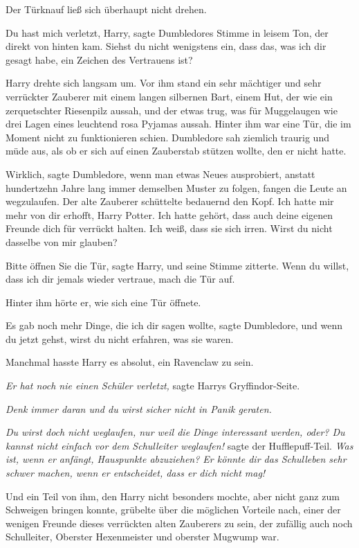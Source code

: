 Der Türknauf ließ sich überhaupt nicht drehen.

\glqq{}Du hast mich verletzt, Harry\grqq{}, sagte Dumbledores Stimme in leisem
Ton, der direkt von hinten kam. \glqq{}Siehst du nicht wenigstens ein, dass das,
was ich dir gesagt habe, ein Zeichen des Vertrauens ist?\grqq{}

Harry drehte sich langsam um. Vor ihm stand ein sehr mächtiger und sehr
verrückter Zauberer mit einem langen silbernen Bart, einem Hut, der wie ein
zerquetschter Riesenpilz aussah, und der etwas trug, was für Muggelaugen wie
drei Lagen eines leuchtend rosa Pyjamas aussah. Hinter ihm war eine Tür, die im
Moment nicht zu funktionieren schien. Dumbledore sah ziemlich traurig und müde
aus, als ob er sich auf einen Zauberstab stützen wollte, den er nicht hatte.

\glqq{}Wirklich\grqq{}, sagte Dumbledore, \glqq{}wenn man etwas Neues ausprobiert,
anstatt hundertzehn Jahre lang immer demselben Muster zu folgen, fangen die
Leute an wegzulaufen.\grqq{} Der alte Zauberer schüttelte bedauernd den Kopf.
\glqq{}Ich hatte mir mehr von dir erhofft, Harry Potter. Ich hatte gehört, dass
auch deine eigenen Freunde dich für verrückt halten. Ich weiß, dass sie sich
irren. Wirst du nicht dasselbe von mir glauben?\grqq{}

\glqq{}Bitte öffnen Sie die Tür\grqq{}, sagte Harry, und seine Stimme zitterte.
\glqq{}Wenn du willst, dass ich dir jemals wieder vertraue, mach die Tür
auf.\grqq{}

Hinter ihm hörte er, wie sich eine Tür öffnete.

\glqq{}Es gab noch mehr Dinge, die ich dir sagen wollte\grqq{}, sagte Dumbledore,
\glqq{}und wenn du jetzt gehst, wirst du nicht erfahren, was sie waren.\grqq{}

Manchmal hasste Harry es absolut, ein Ravenclaw zu sein.

\emph{Er hat noch nie einen Schüler verletzt,} sagte Harrys Gryffindor-Seite.

\emph{Denk immer daran und du wirst sicher nicht in Panik geraten.}

\emph{Du wirst doch nicht weglaufen, nur weil die Dinge interessant werden,
oder? Du kannst nicht einfach vor dem Schulleiter weglaufen!} sagte der
Hufflepuff-Teil. \emph{Was ist, wenn er anfängt, Hauspunkte abzuziehen? Er
könnte dir das Schulleben sehr schwer machen, wenn er entscheidet, dass er dich
nicht mag!}

Und ein Teil von ihm, den Harry nicht besonders mochte, aber nicht ganz zum
Schweigen bringen konnte, grübelte über die möglichen Vorteile nach, einer der
wenigen Freunde dieses verrückten alten Zauberers zu sein, der zufällig auch
noch Schulleiter, Oberster Hexenmeister und oberster Mugwump war.

